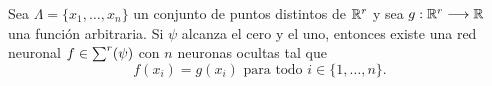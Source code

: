 \begin{teorema}
    \label{teorema:2_5_entrenamiento_redes_neuronales}
    Sea $ \Lambda = \{x_1, \ldots, x_n\}$ un conjunto de puntos distintos de 
    $\mathbb{R}^r$ y sea 
    $g: \mathbb{R}^r \longrightarrow \mathbb{R}$ una función arbitraria. 
    Si $\psi$ alcanza el cero y el uno, 
    entonces
    existe una red neuronal $f \in \sum^r (\psi)$ con $n$
    neuronas ocultas tal que 
    \begin{equation}
        f(x_i) = g(x_i) \text{ para todo } i \in \{1, \ldots, n \}.
    \end{equation}
\end{teorema}
